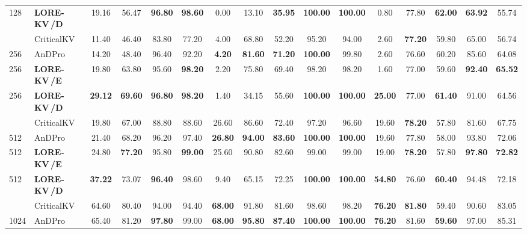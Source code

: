 \documentclass{article} %
\newcommand{\best}[1]{\textcolor{bestblue}{\textbf{#1}}}
\newcommand{\second}[1]{\textcolor{secondorange}{#1}}
\newcommand{\lorekvE}{LORE-KV\,/E}
\newcommand{\lorekvD}{LORE-KV\,/D}
\begin{document}
\begin{table}[p]
{\begin{tabular}{llcccccccccccccc}
128 & \textbf{\lorekvD} & \second{19.16} & \second{56.47} & \best{96.80} & \best{98.60} & \second{0.00} & \second{13.10} & \best{35.95} & \best{100.00} & \best{100.00} & \second{0.80} & \second{77.80} & \best{62.00} & \best{63.92} & \second{55.74} \\
\addlinespace[2pt]
256 & CriticalKV & 11.40 & 46.40 & 83.80 & 77.20 & \second{4.00} & 68.80 & 52.20 & 95.20 & 94.00 & \second{2.60} & \best{77.20} & 59.80 & 65.00 & 56.74 \\
256 & AnDPro & 14.20 & 48.40 & \second{96.40} & \second{92.20} & \best{4.20} & \best{81.60} & \best{71.20} & \best{100.00} & \second{99.80} & \second{2.60} & 76.60 & \second{60.20} & 85.60 & 64.08 \\
256 & \textbf{\lorekvE} & \second{19.80} & \second{63.80} & 95.60 & \best{98.20} & 2.20 & \second{75.80} & \second{69.40} & \second{98.20} & 98.20 & 1.60 & \second{77.00} & 59.60 & \best{92.40} & \best{65.52} \\
256 & \textbf{\lorekvD} & \best{29.12} & \best{69.60} & \best{96.80} & \best{98.20} & 1.40 & 34.15 & 55.60 & \best{100.00} & \best{100.00} & \best{25.00} & \second{77.00} & \best{61.40} & \second{91.00} & \second{64.56} \\
\addlinespace[2pt]
512 & CriticalKV & 19.80 & 67.00 & 88.80 & 88.60 & \second{26.60} & 86.60 & 72.40 & 97.20 & 96.60 & \second{19.60} & \best{78.20} & 57.80 & 81.60 & 67.75 \\
512 & AnDPro & 21.40 & 68.20 & \second{96.20} & 97.40 & \best{26.80} & \best{94.00} & \best{83.60} & \best{100.00} & \best{100.00} & \second{19.60} & \second{77.80} & \second{58.00} & 93.80 & 72.06 \\
512 & \textbf{\lorekvE} & \second{24.80} & \best{77.20} & 95.80 & \best{99.00} & 25.60 & \second{90.80} & \second{82.60} & \second{99.00} & \second{99.00} & 19.00 & \best{78.20} & 57.80 & \best{97.80} & \best{72.82} \\
512 & \textbf{\lorekvD} & \best{37.22} & \second{73.07} & \best{96.40} & \second{98.60} & 9.40 & 65.15 & 72.25 & \best{100.00} & \best{100.00} & \best{54.80} & 76.60 & \best{60.40} & \second{94.48} & \second{72.18} \\
\addlinespace[2pt]
1024 & CriticalKV & 64.60 & 80.40 & 94.00 & 94.40 & \best{68.00} & 91.80 & 81.60 & 98.60 & 98.20 & \best{76.20} & \best{81.80} & \second{59.40} & 90.60 & 83.05 \\
1024 & AnDPro & 65.40 & 81.20 & \best{97.80} & 99.00 & \best{68.00} & \best{95.80} & \best{87.40} & \best{100.00} & \best{100.00} & \best{76.20} & \second{81.60} & \best{59.60} & 97.00 & \second{85.31} \\

\end{tabular}}
\end{table}
\end{document}
